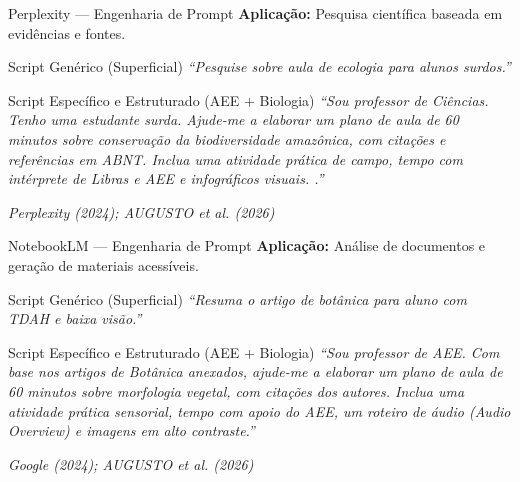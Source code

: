 \documentclass[11pt]{beamer}
\newcommand{\citabnt}[1]{%
	\vfill
	\begin{flushright}
		\tiny\textit{#1}
	\end{flushright}
}
\begin{document}
	\begin{frame}{Perplexity — Engenharia de Prompt}
		\textbf{Aplicação:} Pesquisa científica baseada em evidências e fontes.
		
		\vspace{0.4em}
		\begin{block}{Script Genérico (Superficial)}
			\small
			\textit{``Pesquise sobre aula de ecologia para alunos surdos.''}
		\end{block}
		
		\vspace{0.3em}
		\begin{block}{Script Específico e Estruturado (AEE + Biologia)}
			\justifying
			\small
			\textit{``Sou professor de Ciências. Tenho uma estudante surda. Ajude-me a elaborar um plano de aula de 60 minutos sobre conservação da biodiversidade amazônica, com citações e referências em ABNT. Inclua uma atividade prática de campo, tempo com intérprete de Libras e AEE e infográficos visuais.
				.''}
		\end{block}
		\citabnt{Perplexity (2024); AUGUSTO et al. (2026)}
	\end{frame}
	
	\begin{frame}{NotebookLM — Engenharia de Prompt}
		\textbf{Aplicação:} Análise de documentos e geração de materiais acessíveis.
		
		\vspace{0.4em}
		\begin{block}{Script Genérico (Superficial)}
			\small
			\textit{``Resuma o artigo de botânica para aluno com TDAH e baixa visão.''}
		\end{block}
		
		\vspace{0.3em}
		\begin{block}{Script Específico e Estruturado (AEE + Biologia)}
			\justifying
			\small
			\textit{``Sou professor de AEE. Com base nos artigos de Botânica anexados, ajude-me a elaborar um plano de aula de 60 minutos sobre morfologia vegetal, com citações dos autores. Inclua uma atividade prática sensorial, tempo com apoio do AEE, um roteiro de áudio (Audio Overview) e imagens em alto contraste.''}
		\end{block}
		\citabnt{Google (2024); AUGUSTO et al. (2026)}
	\end{frame}
	
\end{document}
